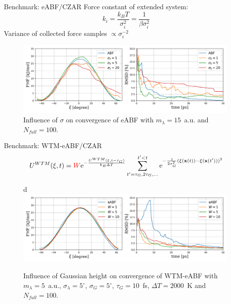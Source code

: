 \documentclass[10pt]{beamer}
\begin{document}
\begin{frame}{Benchmark: eABF/CZAR}
  Force constant of extended system:
  \begin{equation}
    k_i = \frac{k_B T}{\sigma_i^2}=\frac{1}{\beta\sigma_i^2}
  \end{equation}
  Variance of collected force samples $\propto \sigma_i^{-2}$
  \begin{figure}[H]
    \centering
      \includegraphics[width=0.99\textwidth]{bilder/benchmark/eABF_benchmark_sigma}
     \caption{Influence of $\sigma$ on convergence of eABF with $m_\lambda=15$~a.u. and $N_{full}=100$.}
  \end{figure}
\end{frame}

\begin{frame}{Benchmark: WTM-eABF/CZAR}
  \begin{equation}
  U^{WTM}(\xi,t)={\color{red}{W}}\text{e}^{-\frac{U^{WTM}(\xi,t-\tau_G)}{k_B \Delta T}}\sum_{t'=\tau_G,2\tau_G,...}^{t'<t} \text{e}^{-\frac{1}{2\sigma_{G}^{2}} (\xi(\textbf{x}(t))-\xi(\textbf{x}(t')))^2 }
\end{equation}
\begin{figure}[H]d
  \centering
    \includegraphics[width=0.99\textwidth]{bilder/benchmark/meta_eABF_benchmark_height}
   \caption{Influence of Gaussian height on convergence of WTM-eABF with $m_\lambda=5$~a.u., $\sigma_\lambda=5^\circ$, $\sigma_G=5^\circ$, $\tau_G=10$~fs, $\Delta T=2000$~K and $N_{full}=100$.}
\end{figure}
\end{frame}
\end{document}
